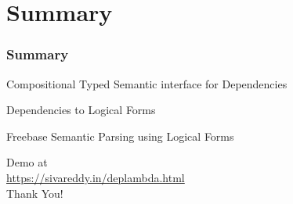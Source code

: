 \documentclass[mathserif,12pt]{beamer}
\newcommand{\hlight}[1]{{\color{blue!80} #1}}
\begin{document}
\section{Summary}
\begin{frame}
\frametitle{Summary}
\large


Compositional Typed Semantic interface for Dependencies
 
\vspace{2em} 
Dependencies to Logical Forms

 \vspace{2em}
Freebase Semantic Parsing using Logical Forms

\vspace{2em}
\begin{center}Demo at\\ \hlight{\url{https://sivareddy.in/deplambda.html}} \\
  Thank You!
\end{center}
\end{frame}
\end{document}
